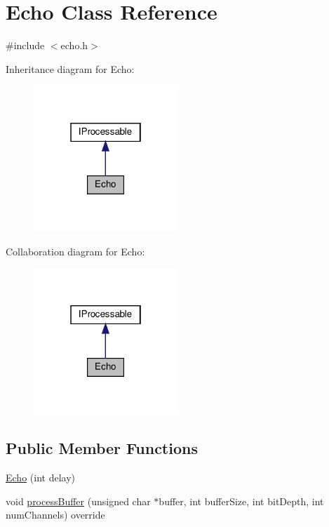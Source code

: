 \hypertarget{classEcho}{}\section{Echo Class Reference}
\label{classEcho}


{\ttfamily \#include $<$echo.\+h$>$}



Inheritance diagram for Echo\+:\nopagebreak
\begin{figure}[H]
\begin{center}
\leavevmode
\includegraphics[width=154pt]{d1/dd3/classEcho__inherit__graph}
\end{center}
\end{figure}


Collaboration diagram for Echo\+:\nopagebreak
\begin{figure}[H]
\begin{center}
\leavevmode
\includegraphics[width=154pt]{da/d44/classEcho__coll__graph}
\end{center}
\end{figure}
\subsection*{Public Member Functions}
\begin{DoxyCompactItemize}
\item 
\hyperlink{classEcho_a9531515ffab8be1e38cbdc0e0e9338a6}{Echo} (int delay)
\item 
void \hyperlink{classEcho_a1cdbe4bf78f5f6ac9b3609d9cd32de94}{process\+Buffer} (unsigned char $\ast$buffer, int buffer\+Size, int bit\+Depth, int num\+Channels) override
\end{DoxyCompactItemize}


